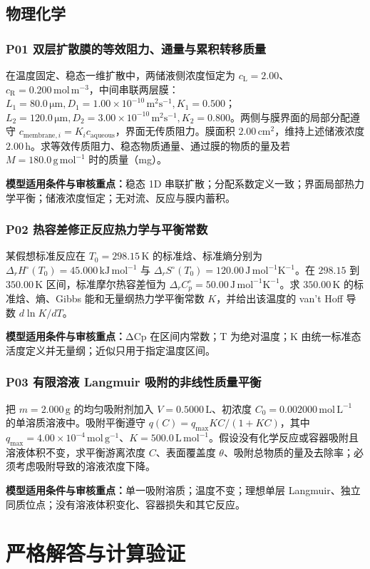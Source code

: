 \documentclass[UTF8,openany,11pt,a4paper]{ctexbook}
\newcommand{\sciencewarn}[1]{\begin{reviewnote}\textbf{\textcolor{warn}{模型适用条件与审核重点：}}#1\end{reviewnote}}
\begin{document}
\chapter{物理化学}
\section{P01 \quad 双层扩散膜的等效阻力、通量与累积转移质量}
在温度固定、稳态一维扩散中，两储液侧浓度恒定为 \(c_{\mathrm L}=2.00\)、\(c_{\mathrm R}=0.200\,\mathrm{mol\,m^{-3}}\)，中间串联两层膜：\(L_1=80.0\,\mathrm{\mu m},D_1=1.00\times10^{-10}\,\mathrm{m^2s^{-1}},K_1=0.500\)；\(L_2=120.0\,\mathrm{\mu m},D_2=3.00\times10^{-10}\,\mathrm{m^2s^{-1}},K_2=0.800\)。两侧与膜界面的局部分配遵守 \(c_{\mathrm{membrane},i}=K_i c_{\mathrm{aqueous}}\)，界面无传质阻力。膜面积 \(2.00\,\mathrm{cm^2}\)，维持上述储液浓度 \(2.00\,\mathrm h\)。求等效传质阻力、稳态物质通量、通过膜的物质的量及若 \(M=180.0\,\mathrm{g\,mol^{-1}}\) 时的质量（mg）。
\sciencewarn{稳态 1D 串联扩散；分配系数定义一致；界面局部热力学平衡；储液浓度恒定；无对流、反应与膜内蓄积。}
\section{P02 \quad 热容差修正反应热力学与平衡常数}
某假想标准反应在 \(T_0=298.15\,\mathrm K\) 的标准焓、标准熵分别为 \(\Delta_rH^\circ(T_0)=45.000\,\mathrm{kJ\,mol^{-1}}\) 与 \(\Delta_rS^\circ(T_0)=120.00\,\mathrm{J\,mol^{-1}K^{-1}}\)。在 \(298.15\) 到 \(350.00\,\mathrm K\) 区间，标准摩尔热容差恒为 \(\Delta_rC_p^\circ=50.00\,\mathrm{J\,mol^{-1}K^{-1}}\)。求 \(350.00\,\mathrm K\) 的标准焓、熵、Gibbs 能和无量纲热力学平衡常数 \(K\)，并给出该温度的 van't Hoff 导数 \(d\ln K/dT\)。
\sciencewarn{ΔCp 在区间内常数；T 为绝对温度；K 由统一标准态活度定义并无量纲；近似只用于指定温度区间。}
\section{P03 \quad 有限溶液 Langmuir 吸附的非线性质量平衡}
把 \(m=2.000\,\mathrm g\) 的均匀吸附剂加入 \(V=0.5000\,\mathrm L\)、初浓度 \(C_0=0.002000\,\mathrm{mol\,L^{-1}}\) 的单溶质溶液中。吸附平衡遵守 \(q(C)=q_{\max}KC/(1+KC)\)，其中 \(q_{\max}=4.00\times10^{-4}\,\mathrm{mol\,g^{-1}}\)、\(K=500.0\,\mathrm{L\,mol^{-1}}\)。假设没有化学反应或容器吸附且溶液体积不变，求平衡游离浓度 \(C\)、表面覆盖度 \(\theta\)、吸附总物质的量及去除率；必须考虑吸附导致的溶液浓度下降。
\sciencewarn{单一吸附溶质；温度不变；理想单层 Langmuir、独立同质位点；没有溶液体积变化、容器损失和其它反应。}
\cleardoublepage\part{严格解答与计算验证}
\end{document}
